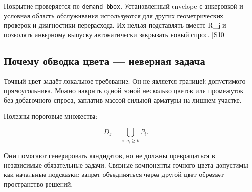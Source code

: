 \documentclass[11pt,a4paper]{article}
\begin{document}
Покрытие проверяется по {\small\nolinkurl{demand_bbox}}. Установленный envelope с анкеровкой и условная область обслуживания используются для других геометрических проверок и диагностики перерасхода. Их нельзя подставлять вместо R\_j и позволять анкерному выпуску автоматически закрывать новый спрос. {\color{Teal}\small[\hyperlink{S10}{S10}]}


\subsection{Почему обводка цвета — неверная задача}

Точный цвет задаёт локальное требование. Он не является границей допустимого прямоугольника. Можно накрыть одной зоной несколько цветов или промежуток без добавочного спроса, заплатив массой сильной арматуры на лишнем участке.


Полезны пороговые множества:


\[
D_k=\bigcup_{i:\,q_i\ge k}P_i.
\]

Они помогают генерировать кандидатов, но не должны превращаться в независимые обязательные задачи. Связные компоненты точного цвета допустимы как начальные подсказки; запрет объединяться через другой цвет обрезает пространство решений.
\end{document}
